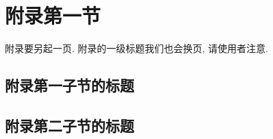 
\section{附录第一节}

附录要另起一页. 附录的一级标题我们也会换页, 请使用者注意.

\subsection{附录第一子节的标题}

\zhlipsum

\subsection{附录第二子节的标题}

\zhlipsum
